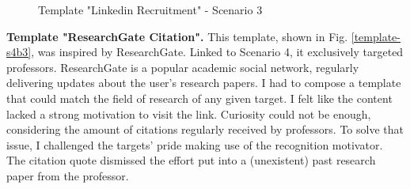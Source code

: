 \documentclass[a4paper]{article}
\begin{document}
\begin{figure}[H]
	\centering
	\caption{Template "Linkedin Recruitment" - Scenario 3}
	\label{template-s3b3}
\end{figure}

\newpage

\noindent
\textbf{Template "ResearchGate Citation".} This template, shown in Fig. \ref{template-s4b3}, was inspired by ResearchGate. Linked to Scenario 4, it exclusively targeted professors. ResearchGate is a popular academic social network, regularly delivering updates about the user's research papers. I had to compose a template that could match the field of research of any given target. I felt like the content lacked a strong motivation to visit the link. Curiosity could not be enough, considering the amount of citations regularly received by professors. To solve that issue, I challenged the targets' pride making use of the recognition motivator. The citation quote dismissed the effort put into a (unexistent) past research paper from the professor.

\bigskip
\end{document}
